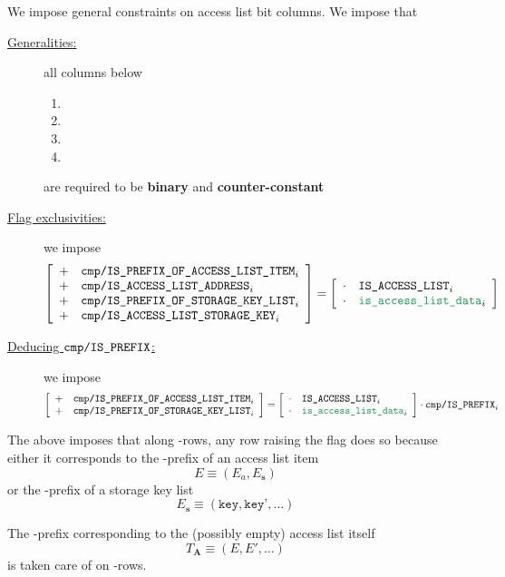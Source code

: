 \begin{center}
\end{center}
We impose general constraints on access list bit columns.
We impose that
\begin{description}
    \item[\underline{Generalities:}]
	all columns below
	\begin{multicols}{2}
	    \begin{enumerate}
		\item
		    \rlpTxnComputationColumnIsPrefixOfAccessListItem
		\item
		    \rlpTxnComputationColumnIsAccessListAddress
		\item
		    \rlpTxnComputationColumnIsPrefixOfStorageKeyList
		\item
		    \rlpTxnComputationColumnIsAccessListStorageKey
	    \end{enumerate}
	\end{multicols}
	are required to be \textbf{binary} and \textbf{counter-constant}
    \item[\underline{Flag exclusivities:}]
	we impose
	\[
	    \left[ \begin{array}{cl}
		+ & \rlpTxnComputationColumnIsPrefixOfAccessListItem _{i} \\
		+ & \rlpTxnComputationColumnIsAccessListAddress      _{i} \\
		+ & \rlpTxnComputationColumnIsPrefixOfStorageKeyList _{i} \\
		+ & \rlpTxnComputationColumnIsAccessListStorageKey   _{i} \\
	    \end{array} \right]
	    = 
	    \left[ \begin{array}{cl}
		\cdot & \phaseAccessList   _{i} \\
		\cdot & \locAccessListData _{i} \\
	    \end{array} \right]
	\]
    \item[\underline{Deducing $\texttt{cmp}\texttt{/}\texttt{{\texttt{IS\_PREFIX}}}$:}]
	we impose
	\[
	    \left[ \begin{array}{cl}
		+ & \rlpTxnComputationColumnIsPrefixOfAccessListItem _{i} \\
		+ & \rlpTxnComputationColumnIsPrefixOfStorageKeyList _{i} \\
	    \end{array} \right]
	    =
	    \left[ \begin{array}{cl}
		\cdot & \phaseAccessList                 _{i} \\
		\cdot & \locAccessListData               _{i} \\
	    \end{array} \right]
	    \cdot
	    \rlpTxnComputationColumnIsPrefix _{i}
	\]
\end{description}
\saNote{}
The above imposes that along \locAccessListData{}-rows, any row raising the
\rlpTxnComputationColumnIsPrefix{} flag does so because either it corresponds to
the \rlp{}-prefix of an access list item
\[
    E \equiv (E_a, E_\textbf{s})
\]
or the \rlp{}-prefix of a storage key list
\[
    E_\textbf{s} \equiv (\texttt{key}, \texttt{key'}, \dots)
\]

\saNote{}
The \rlp{}-prefix corresponding to the (possibly empty) access list itself
\[
    T_\mathbf{A} \equiv (E, E', \dots)
\]
is taken care of on \locAccessListPrefix{}-rows.
